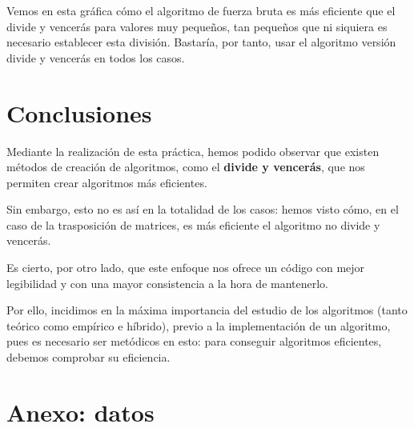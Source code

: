 \documentclass[10pt, a4paper]{article}
\theoremstyle{theorem-style}
\theoremstyle{theorem-style}
\theoremstyle{definition-style}
\theoremstyle{remark-style}
\theoremstyle{example-style}
\theoremstyle{definition-style}
\theoremstyle{remark-style}
\begin{document}
Vemos en esta gráfica cómo el algoritmo de fuerza bruta es más eficiente que el divide y vencerás para valores muy pequeños, tan pequeños que ni siquiera es necesario establecer esta división. Bastaría, por tanto, usar el algoritmo versión divide y vencerás en todos los casos.

\pagebreak
\part{Conclusiones}

Mediante la realización de esta práctica, hemos podido observar que existen métodos de creación de algoritmos, como el \textbf{divide y vencerás}, que nos permiten crear algoritmos más eficientes.

Sin embargo, esto no es así en la totalidad de los casos: hemos visto cómo, en el caso de la trasposición de matrices, es más eficiente el algoritmo no divide y vencerás.

Es cierto, por otro lado, que este enfoque nos ofrece un código con mejor legibilidad y con una mayor consistencia a la hora de mantenerlo.

Por ello, incidimos en la máxima importancia del estudio de los algoritmos (tanto teórico como empírico e híbrido), previo a la implementación de un algoritmo, pues es necesario ser metódicos en esto: para conseguir algoritmos eficientes, debemos comprobar su eficiencia.

\pagebreak

\part{Anexo: datos}

\begin{center}
\end{center}
\end{document}
